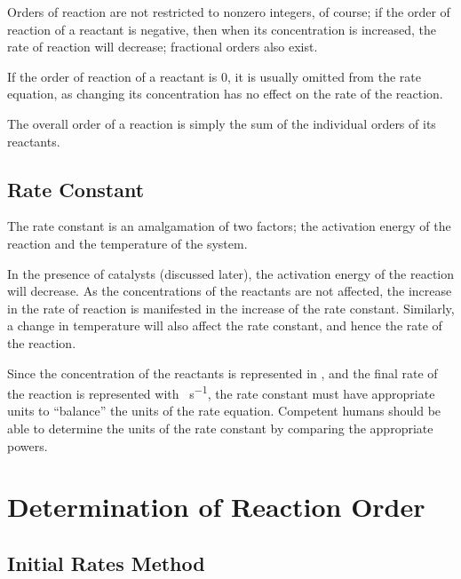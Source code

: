 			Orders of reaction are not restricted to nonzero integers, of course; if the order of reaction of a reactant is negative, then when
			its concentration is increased, the rate of reaction will decrease; fractional orders also exist.

			If the order of reaction of a reactant is 0, it is usually omitted from the rate equation, as changing its concentration has no
			effect on the rate of the reaction.

			The overall order of a reaction is simply the sum of the individual orders of its reactants.




		\subsection{Rate Constant}

			The rate constant  is an amalgamation of two factors; the activation energy of the reaction and the temperature
			of the system.

			In the presence of catalysts (discussed later), the activation energy of the reaction will decrease. As the concentrations of the
			reactants are not affected, the increase in the rate of reaction is manifested in the increase of the rate constant. Similarly, a
			change in temperature will also affect the rate constant, and hence the rate of the reaction.

			Since the concentration of the reactants is represented in \si{\molarConc}, and the final rate of the reaction is
			represented with \si{\molarConc\per\second}, the rate constant must have appropriate units to ``balance'' the units
			of the rate equation. Competent humans should be able to determine the units of the rate constant by comparing the appropriate powers.








	\pagebreak
	\section{Determination of Reaction Order}

		\subsection{Initial Rates Method}

